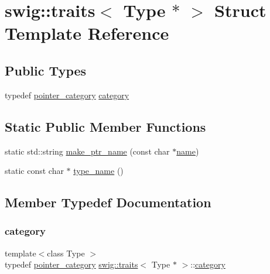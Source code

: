 \hypertarget{structswig_1_1traits_3_01_type_01_5_01_4}{}\section{swig\+:\+:traits$<$ Type $\ast$ $>$ Struct Template Reference}
\label{structswig_1_1traits_3_01_type_01_5_01_4}
\subsection*{Public Types}
\begin{DoxyCompactItemize}
\item 
typedef \hyperlink{structswig_1_1pointer__category}{pointer\+\_\+category} \hyperlink{structswig_1_1traits_3_01_type_01_5_01_4_a500d091f0454ce9f328c030b191ac18f}{category}
\end{DoxyCompactItemize}
\subsection*{Static Public Member Functions}
\begin{DoxyCompactItemize}
\item 
static std\+::string \hyperlink{structswig_1_1traits_3_01_type_01_5_01_4_a5251b3fb5f48a5a48f17c25cafe21817}{make\+\_\+ptr\+\_\+name} (const char $\ast$\hyperlink{lp__lib_8h_a2946c588fc7fa2fa5b43ac54b7872725}{name})
\item 
static const char $\ast$ \hyperlink{structswig_1_1traits_3_01_type_01_5_01_4_ac5aae8203a9a4b151f6719e58a0cc252}{type\+\_\+name} ()
\end{DoxyCompactItemize}


\subsection{Member Typedef Documentation}
\mbox{\label{structswig_1_1traits_3_01_type_01_5_01_4_a500d091f0454ce9f328c030b191ac18f}} 
\subsubsection{\texorpdfstring{category}{category}}
{\footnotesize\ttfamily template$<$class Type $>$ \\
typedef \hyperlink{structswig_1_1pointer__category}{pointer\+\_\+category} \hyperlink{structswig_1_1traits}{swig\+::traits}$<$ Type $\ast$ $>$\+::\hyperlink{structswig_1_1traits_3_01_type_01_5_01_4_a500d091f0454ce9f328c030b191ac18f}{category}}



